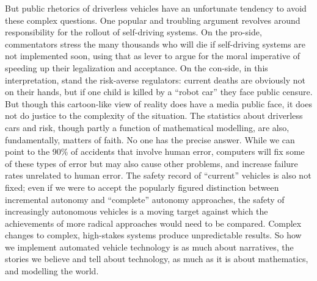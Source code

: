 But public rhetorics of driverless vehicles have an unfortunate
tendency to avoid these complex questions. One popular and troubling
argument revolves around responsibility for the rollout of
self-driving systems. On the pro-side, commentators stress the many
thousands who will die if self-driving systems are not implemented
soon, using that as lever to argue for the moral imperative of
speeding up their legalization and acceptance.\cite{???} On the con-side, in
this interpretation, stand the risk-averse regulators: current deaths
are obviously not on their hands, but if one child is killed by a
``robot car'' they face public censure. But though this cartoon-like
view of reality does have a media public face, it does not do justice
to the complexity of the situation. The statistics about driverless
cars and risk, though partly a function of mathematical modelling, are
also, fundamentally, matters of faith. No one has the precise answer.
While we can point to the 90\% of accidents that involve human error,
computers will fix some of these types of error but may also cause
other problems, and increase failure rates unrelated to human error.
The safety record of ``current'' vehicles is also not fixed; even if
we were to accept the popularly figured distinction between
incremental autonomy and ``complete'' autonomy approaches, the safety
of increasingly autonomous vehicles is a moving target against which
the achievements of more radical approaches would need to be compared.
Complex changes to complex, high-stakes systems produce unpredictable
results. So how we implement automated vehicle technology is as much
about narratives, the stories we believe and tell about technology, as
much as it is about mathematics, and modelling the world. 

